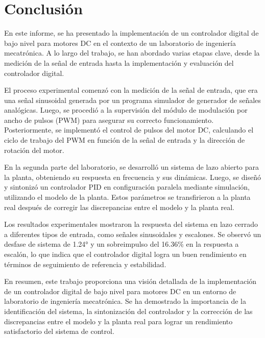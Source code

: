 \documentclass[conference,onecolumn]{IEEEtran}
\begin{document}
\section{Conclusión}
En este informe, se ha presentado la implementación de un controlador digital de bajo nivel para motores DC en el contexto de un laboratorio de ingeniería mecatrónica. A lo largo del trabajo, se han abordado varias etapas clave, desde la medición de la señal de entrada hasta la implementación y evaluación del controlador digital.

El proceso experimental comenzó con la medición de la señal de entrada, que era una señal sinusoidal generada por un programa simulador de generador de señales analógicas. Luego, se procedió a la supervisión del módulo de modulación por ancho de pulsos (PWM) para asegurar su correcto funcionamiento. Posteriormente, se implementó el control de pulsos del motor DC, calculando el ciclo de trabajo del PWM en función de la señal de entrada y la dirección de rotación del motor.

En la segunda parte del laboratorio, se desarrolló un sistema de lazo abierto para la planta, obteniendo su respuesta en frecuencia y sus dinámicas. Luego, se diseñó y sintonizó un controlador PID en configuración paralela mediante simulación, utilizando el modelo de la planta. Estos parámetros se transfirieron a la planta real después de corregir las discrepancias entre el modelo y la planta real.

Los resultados experimentales mostraron la respuesta del sistema en lazo cerrado a diferentes tipos de entrada, como señales sinusoidales y escalones. Se observó un desfase de sistema de 1.24° y un sobreimpulso del 16.36\% en la respuesta a escalón, lo que indica que el controlador digital logra un buen rendimiento en términos de seguimiento de referencia y estabilidad.

En resumen, este trabajo proporciona una visión detallada de la implementación de un controlador digital de bajo nivel para motores DC en un entorno de laboratorio de ingeniería mecatrónica. Se ha demostrado la importancia de la identificación del sistema, la sintonización del controlador y la corrección de las discrepancias entre el modelo y la planta real para lograr un rendimiento satisfactorio del sistema de control.

%  
%
\end{document}

